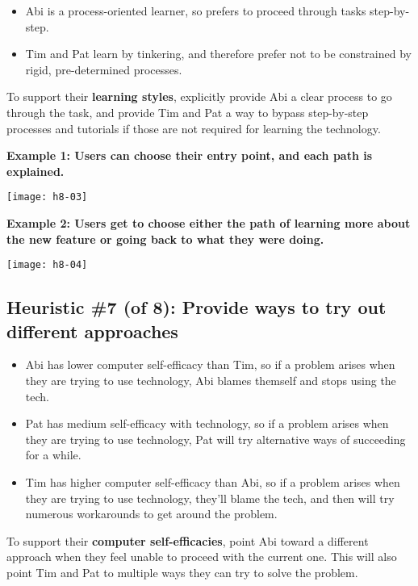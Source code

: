 \begin{itemize}
\item Abi is a process-oriented learner, so prefers to proceed through tasks step-by-step.
\item Tim and Pat learn by tinkering, and therefore prefer not to be constrained by rigid, pre-determined processes.
\end{itemize}

\noindent To support their \textbf{learning styles}, explicitly provide Abi a clear process to go through the task, and provide Tim and Pat a way to bypass step-by-step processes and tutorials if those are not required for learning the technology.

\spacer
\noindent\textbf{Example 1: Users can choose their entry point, and each path is explained.}\\
\begin{center}
\noindent\texttt{[image: h8-03]}
\end{center}

\noindent\textbf{Example 2: Users get to choose either the path of learning more about the new feature or going back to what they were doing.}\\
\begin{center}
\noindent\texttt{[image: h8-04]}
\end{center}

\subsection{Heuristic \#7 (of 8): Provide ways to try out different approaches}

\begin{itemize}
\item Abi has lower computer self-efficacy than Tim, so if a problem arises when they are trying to use technology, Abi blames themself and stops using the tech.
\item Pat has medium self-efficacy with technology, so if a problem arises when they are trying to use technology,  Pat will try alternative ways of succeeding for a while.
\item Tim has higher computer self-efficacy than Abi, so if a problem arises when they are trying to use technology, they’ll blame the tech, and then will try numerous workarounds to get around the problem.
\end{itemize}

\noindent To support their \textbf{computer self-efficacies}, point Abi toward a different approach when they feel unable to proceed with the current one. This will also point Tim and Pat to multiple ways they can try to solve the problem.

